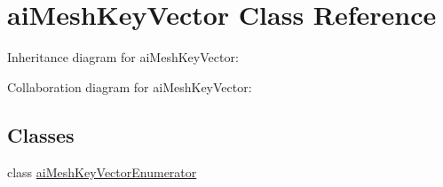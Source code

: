 \hypertarget{classai_mesh_key_vector}{\section{ai\+Mesh\+Key\+Vector Class Reference}
\label{classai_mesh_key_vector}
}


Inheritance diagram for ai\+Mesh\+Key\+Vector\+:


Collaboration diagram for ai\+Mesh\+Key\+Vector\+:
\subsection*{Classes}
\begin{DoxyCompactItemize}
\item 
class \hyperlink{classai_mesh_key_vector_1_1ai_mesh_key_vector_enumerator}{ai\+Mesh\+Key\+Vector\+Enumerator}
\end{DoxyCompactItemize}
